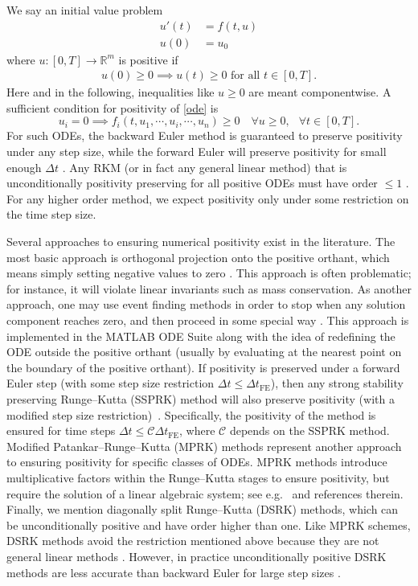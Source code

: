 \documentclass[a4paper]{article}
\numberwithin{equation}{section}
\theoremstyle{plain}
\theoremstyle{definition}
\numberwithin{theorem}{section}
\newcommand{\R}{\mathbb{R}}
\newcommand{\dt}{{\Delta t}}
\newcommand{\1}{\mathbbm{1}}
\begin{document}
We say an initial value problem
\begin{align} \label{ode}
    u'(t) & = f(t,u) \\
    u(0) & = u_0
\end{align}
where $u\colon [0,T] \to \R^m$ is positive if
\begin{align} \label{continuous-positivity}
    u(0)\ge 0 \implies u(t) \ge 0 \text{ for all } t \in [0,T].
\end{align}
Here and in the following, inequalities like $u \geq 0$ are meant componentwise.
A sufficient condition for positivity of \eqref{ode} is
\begin{equation} \label{eq:condition_ODE_pos}
u_i=0 \implies f_i(t,u_1,\cdots,u_i,\cdots,u_n) \geq 0 \quad \forall {u \geq 0,}\; \ \  \forall {t\in[0,T]}.
\end{equation}
For such ODEs, the backward Euler method is guaranteed to preserve positivity
under any step size, while the forward Euler will preserve positivity for small enough $\dt$ \cite{hundsdorfer_numerical_2003}.
Any RKM (or in fact any general linear method) that is unconditionally positivity preserving for all positive ODEs
must have order $\le 1$ \cite{bolley_conservation_1978}.
For any higher order method, we expect positivity only under some restriction
on the time step size.

Several approaches to ensuring numerical positivity exist in the literature.
The most basic approach is orthogonal projection onto the positive orthant,
which means simply setting negative values to zero \cite{shampine1986conservation}.  This approach is often problematic;
for instance, it will violate linear invariants such as mass conservation.
As another approach, one may use event finding methods in order to stop when any solution component
reaches zero, and then proceed in some special way
\cite{shampine_non-negative_2005}. This approach is implemented in the MATLAB
ODE Suite along with the idea of redefining the ODE outside the positive orthant (usually
by evaluating at the nearest point on the boundary of the positive orthant).
If positivity is preserved under a forward Euler step (with
some step size restriction $\dt \le \dt_\text{FE}$), then any strong stability preserving Runge--Kutta (SSPRK)
method will also preserve positivity (with a modified step size restriction)~\cite{gottlieb_strong_2011}.
Specifically, the positivity of the method is ensured for time steps
$\dt \leq {\mathcal C} \dt_\text{FE}$, where ${\mathcal C}$ depends on the SSPRK method.
Modified Patankar--Runge--Kutta (MPRK) methods represent another approach to ensuring
positivity for specific classes of ODEs. MPRK methods introduce multiplicative
factors within the Runge--Kutta stages to ensure positivity, but require the solution
of a linear algebraic system; see e.g.\ \cite{kopecz_comparison_2019} and references therein.
Finally, we mention diagonally split Runge--Kutta (DSRK) methods, which can be unconditionally
positive and have order higher than one. Like MPRK schemes, DSRK methods avoid
the restriction mentioned above because
they are not general linear methods \cite{horvath_positivity_1998}.  However, in practice
unconditionally positive DSRK methods are less accurate than backward Euler for
large step sizes \cite{macdonald2007}.
\end{document}
